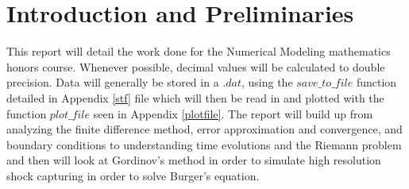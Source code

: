 \chapter{Introduction and Preliminaries}
This report will detail the work done for the Numerical Modeling mathematics honors course. Whenever possible, decimal values will be calculated to double precision. Data will generally be stored in a $.dat$, using the $save\_to\_file$ function detailed in Appendix \ref{stf} file which will then be read in and plotted with the function $plot\_file$ seen in Appendix \ref{plotfile}. The report will build up from analyzing the finite difference method, error approximation and convergence, and boundary conditions to understanding time evolutions and the Riemann problem and then will look at Gordinov's method in order to simulate high resolution shock capturing in order to solve Burger's equation.